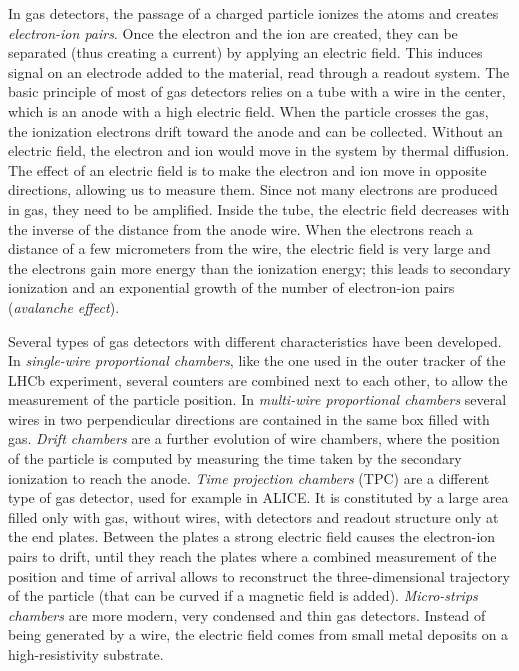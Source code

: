 In gas detectors, the passage of a charged particle ionizes the atoms and creates \textit{electron-ion pairs}. Once the electron and the ion are created, they can be separated (thus creating a current) by applying an electric field. This induces signal on an electrode added to the material, read through a readout system. The basic principle of most of gas detectors relies on a tube with a wire in the center, which is an anode with a high electric field. When the particle crosses the gas, the ionization electrons drift toward the anode and can be collected. 
Without an electric field, the electron and ion would move in the system by thermal diffusion. The effect of an electric field is to make the electron and ion move in opposite directions, allowing us to measure them. Since not many electrons are produced in gas, they need to be amplified. Inside the tube, the electric field decreases with the inverse of the distance from the anode wire. When the electrons reach a distance of a few micrometers from the wire, the electric field is very large and the electrons gain more energy than the ionization energy; this leads to secondary ionization and an exponential growth of the number of electron-ion pairs (\textit{avalanche effect}). 

Several types of gas detectors with different characteristics have been developed. In \textit{single-wire proportional chambers}, like the one used in the outer tracker of the LHCb experiment, several counters are combined next to each other, to allow the measurement of the particle position. In \textit{multi-wire proportional chambers} \cite{CHARPAK1968262} several wires in two perpendicular directions are contained in the same box filled with gas. 
\textit{Drift chambers} are a further evolution of wire chambers, where the position of the particle is computed by measuring the time taken by the 
secondary ionization to reach the anode. \textit{Time projection chambers} (TPC) are a different type of gas detector, used for example in ALICE. 
It is constituted by a large area filled only with gas, without wires, with detectors and readout structure only at the end plates. 
Between the plates a strong electric field causes the electron-ion pairs to drift, 
until they reach the plates where a combined measurement of the position and time of arrival allows to reconstruct the three-dimensional 
trajectory of the particle (that can be curved if a magnetic field is added). 
\textit{Micro-strips chambers} \cite{OED1988351} are more modern, very condensed and thin gas detectors. 
Instead of being generated by a wire, the electric field comes from small metal deposits on a high-resistivity substrate.   

